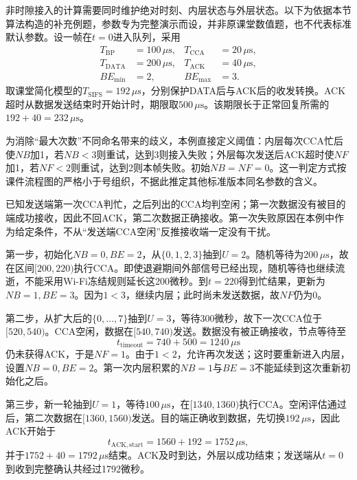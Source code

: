 非时隙接入的计算需要同时维护绝对时刻、内层状态与外层状态。以下为依据本节算法构造的补充例题，参数专为完整演示而设，并非原课堂数值题，也不代表标准默认参数。设一帧在$t=0$进入队列，采用
\begin{align}
 T_{\mathrm{BP}}&=100\,\mu\mathrm{s}, &
 T_{\mathrm{CCA}}&=20\,\mu\mathrm{s},\\
 T_{\mathrm{DATA}}&=200\,\mu\mathrm{s}, &
 T_{\mathrm{ACK}}&=40\,\mu\mathrm{s},\\
 BE_{\min}&=2, & BE_{\max}&=3.
\end{align}
取课堂简化模型的$T_{\mathrm{SIFS}}=192\,\mu\mathrm{s}$，分别保护DATA后与ACK后的收发转换。ACK超时从数据发送结束时开始计时，期限取$500\,\mu\mathrm{s}$。该期限长于正常回复所需的$192+40=232\,\mu\mathrm{s}$。

为消除“最大次数”不同命名带来的歧义，本例直接定义阈值：内层每次CCA忙后使$NB$加1，若$NB<3$则重试，达到3则接入失败；外层每次发送后ACK超时使$NF$加1，若$NF<2$则重试，达到2则本帧失败。初始$NB=NF=0$。这一判定方式按课件流程图的严格小于号组织，不据此推定其他标准版本同名参数的含义。

已知发送端第一次CCA判忙，之后列出的CCA均判空闲；第一次数据没有被目的端成功接收，因此不回ACK，第二次数据正确接收。第一次失败原因在本例中作为给定条件，不从“发送端CCA空闲”反推接收端一定没有干扰。

第一步，初始化$NB=0,BE=2$，从$\{0,1,2,3\}$抽到$U=2$。随机等待为$200\,\mu\mathrm{s}$，故在区间$[200,220)$执行CCA。即使退避期间外部信号已经出现，随机等待也继续流逝，不能采用Wi-Fi冻结规则延长这200微秒。到$t=220$得到忙结果，更新为$NB=1,BE=3$。因为$1<3$，继续内层；此时尚未发送数据，故$NF$仍为0。

第二步，从扩大后的$\{0,\ldots,7\}$抽到$U=3$，等待300微秒，故下一次CCA位于$[520,540)$。CCA空闲，数据在$[540,740)$发送。数据没有被正确接收，节点等待至
\begin{equation}
 t_{\mathrm{timeout}}=740+500=1240\,\mu\mathrm{s}
\end{equation}
仍未获得ACK，于是$NF=1$。由于$1<2$，允许再次发送；这时要重新进入内层，设置$NB=0,BE=2$。第一次内层积累的$NB=1$与$BE=3$不能延续到这次重新初始化之后。

第三步，新一轮抽到$U=1$，等待$100\,\mu\mathrm{s}$，在$[1340,1360)$执行CCA。空闲评估通过后，第二次数据在$[1360,1560)$发送。目的端正确收到数据，先切换$192\,\mu\mathrm{s}$，因此ACK开始于
\begin{equation}
 t_{\mathrm{ACK,start}}=1560+192=1752\,\mu\mathrm{s},
\end{equation}
并于$1752+40=1792\,\mu\mathrm{s}$结束。ACK及时到达，外层以成功结束；发送端从$t=0$到收到完整确认共经过1792微秒。

